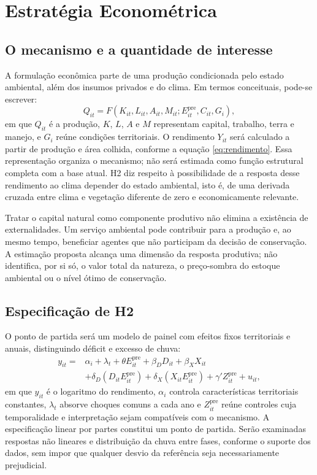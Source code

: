 \section{Estratégia Econométrica}

\subsection{O mecanismo e a quantidade de interesse}

A formulação econômica parte de uma produção condicionada pelo estado ambiental, além dos insumos privados e do clima. Em termos conceituais, pode-se escrever:
\begin{equation}
Q_{it}=F(K_{it},L_{it},A_{it},M_{it};E^{\mathrm{pre}}_{it},C_{it},G_i),
\label{eq:producao}
\end{equation}
em que $Q_{it}$ é a produção, $K$, $L$, $A$ e $M$ representam capital, trabalho, terra e manejo, e $G_i$ reúne condições territoriais. O rendimento $Y_{it}$ será calculado a partir de produção e área colhida, conforme a equação \ref{eq:rendimento}. Essa representação organiza o mecanismo; não será estimada como função estrutural completa com a base atual. H2 diz respeito à possibilidade de a resposta desse rendimento ao clima depender do estado ambiental, isto é, de uma derivada cruzada entre clima e vegetação diferente de zero e economicamente relevante.

Tratar o capital natural como componente produtivo não elimina a existência de externalidades. Um serviço ambiental pode contribuir para a produção e, ao mesmo tempo, beneficiar agentes que não participam da decisão de conservação. A estimação proposta alcança uma dimensão da resposta produtiva; não identifica, por si só, o valor total da natureza, o preço-sombra do estoque ambiental ou o nível ótimo de conservação.

\subsection{Especificação de H2}

O ponto de partida será um modelo de painel com efeitos fixos territoriais e anuais, distinguindo déficit e excesso de chuva:
\begin{align}
y_{it}={}&\alpha_i+\lambda_t+\theta E^{\mathrm{pre}}_{it}
+\beta_D D_{it}+\beta_X X_{it}\nonumber\\
&+\delta_D(D_{it}E^{\mathrm{pre}}_{it})
+\delta_X(X_{it}E^{\mathrm{pre}}_{it})
+\gamma'Z^{\mathrm{pre}}_{it}+u_{it},
\label{eq:h2}
\end{align}
em que $y_{it}$ é o logaritmo do rendimento, $\alpha_i$ controla características territoriais constantes, $\lambda_t$ absorve choques comuns a cada ano e $Z^{\mathrm{pre}}_{it}$ reúne controles cuja temporalidade e interpretação sejam compatíveis com o mecanismo. A especificação linear por partes constitui um ponto de partida. Serão examinadas respostas não lineares e distribuição da chuva entre fases, conforme o suporte dos dados, sem impor que qualquer desvio da referência seja necessariamente prejudicial.

